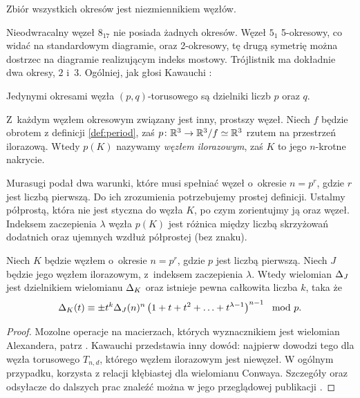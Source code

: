 \begin{proposition}
    Zbiór wszystkich okresów jest niezmiennikiem węzłów.
\end{proposition}

Nieodwracalny węzeł $8_{17}$ nie posiada żadnych okresów.
Węzeł $5_1$ 5-okresowy, co widać na standardowym diagramie, oraz 2-okresowy, tę drugą symetrię można dostrzec na diagramie realizującym indeks mostowy.
Trójlistnik ma dokładnie dwa okresy, $2$ i~$3$.
Ogólniej, jak głosi Kawauchi \cite[ćwiczenie 10.1.9]{kawauchi96}:

\begin{proposition}
    Jedynymi okresami węzła $(p, q)$-torusowego są dzielniki liczb $p$ oraz $q$.
\end{proposition}

Z~każdym węzłem okresowym związany jest inny, prostszy węzeł.
Niech $f$ będzie obrotem z definicji \ref{def:period}, zaś $p \colon \mathbb R^3 \to \mathbb R^3/f \simeq \mathbb R^3$ rzutem na przestrzeń ilorazową.
Wtedy $p(K)$ nazywamy \emph{węzłem ilorazowym}, zaś $K$ to jego $n$-krotne nakrycie.

Murasugi podał dwa warunki, które musi spełniać węzeł o~okresie $n = p^r$, gdzie $r$ jest liczbą pierwszą.
Do ich zrozumienia potrzebujemy prostej definicji.
Ustalmy półprostą, która nie jest styczna do węzła $K$, po czym zorientujmy ją oraz węzeł.
Indeksem zaczepienia $\lambda$ węzła $p(K)$ jest różnica między liczbą skrzyżowań dodatnich oraz ujemnych wzdłuż półprostej (bez znaku).

\begin{proposition}
    \label{prp:murasugi_periodic}
    Niech $K$ będzie węzłem o~okresie $n = p^r$, gdzie $p$ jest liczbą pierwszą.
    Niech $J$ będzie jego węzłem ilorazowym, z~indeksem zaczepienia $\lambda$.
    Wtedy wielomian $\Delta_J$ jest dzielnikiem wielomianu $\Delta_K$ oraz istnieje pewna całkowita liczba $k$, taka że
    \begin{equation}
        \Delta_K(t) \equiv \pm t^k \Delta_J(n)^n \left(1 + t + t^2 + \ldots + t^{\lambda - 1}\right)^{n-1} \mod p.
    \end{equation}
\end{proposition}

\begin{proof}
    Mozolne operacje na macierzach, których wyznacznikiem jest wielomian Alexandera, patrz \cite{murasugi71}.
    Kawauchi przedstawia inny dowód: najpierw dowodzi tego dla węzła torusowego $T_{n, d}$, którego węzłem ilorazowym jest niewęzeł.
    W ogólnym przypadku, korzysta z relacji kłębiastej dla wielomianu Conwaya.
    Szczegóły oraz odsyłacze do dalszych prac znaleźć można w jego przeglądowej publikacji \cite[s. 122-124]{kawauchi96}.
\end{proof}

